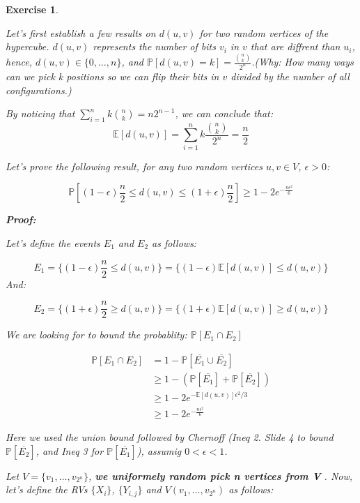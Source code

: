 \documentclass{article}
\newtheorem{exo}{Exercise}
\def\P{\mathbb{P}}
\def\E{\mathbb{E}}
\begin{document}
\begin{exo}{\ \\}

    Let's first establish a few results on $d(u,v)$ for two random vertices of the hypercube. $d(u,v)$ represents the number of bits $v_i$ in $v$ that are diffrent than $u_i$, hence, $d(u,v) \in \{0, \dots, n\}$, and $\P[d(u,v) = k] = \frac{\binom{n}{k}}{2^n}$.(Why: How many ways can we pick k positions so we can flip their bits in $v$ divided by the number of all configurations.)

    By noticing that $\sum^{n}_{i=1} k \binom{n}{k} = n 2^{n-1}$, we can conclude that:
    \[
\E[d(u,v)] = \sum^{n}_{i=1} k \frac{\binom{n}{k}}{2^n} = \frac{n}{2}
    \]
 

    Let's prove the following result, for any two random vertices $u,v \in V    $, $\epsilon > 0$:

    \[
        \P\left[(1-\epsilon)\frac{n}{2} \leq d(u,v) \leq (1+\epsilon)\frac{n}{2}\right]
        \geq 1 - 2 e^{-\frac{n \epsilon^2 }{6}}  
    \]

\begin{tcolorbox}
   \textbf{Proof:}  

    Let's define the events $E_1$ and $E_2$ as follows:


    \[
        E_1 = \{ (1-\epsilon) \frac{n}{2} \leq d(u,v)\} 
        = \{ (1-\epsilon) \E[d(u,v)] \leq d(u,v)\}
    \]
    And:

    \[
        E_2    = \{ (1+\epsilon) \frac{n}{2} \geq d(u,v)\} 
        = \{(1+\epsilon) \E[d(u,v)] \geq d(u,v)\}    
    \]

We are looking for to bound the probablity: $\P[E_1 \cap E_2]$

\begin{align*}
    \P[E_1 \cap E_2] 
    &= 1 - \P[\overline{E_1} \cup \overline{E_2}] \\
    &\geq 1 - (\P[\overline{E_1}] +  \P[\overline{E_2}]) \\
    &\geq  1 - 2 e^{-\E[d(u,v)]\epsilon^2 / 3} \\
    &\geq  1 - 2 e^{-\frac{n \epsilon^2 }{6}} 
\end{align*}

Here we used the union bound followed by Chernoff 
(Ineq 2. Slide 4 to bound $\P[\overline{E_2}]$, and Ineq 3 for $\P[\overline{E_1}]$), assumig $0 < \epsilon < 1$.
\end{tcolorbox}


Let $V = \{v_1, \dots, v_{2^n}\}$, \textbf{we uniformely random pick n vertices from V }.  Now, let's define the RVs $\{X_i\}$, $\{Y_{i,j}\}$ and $V(v_1, \dots, v_{2^n})$ as follows:


\end{exo}
\end{document}
